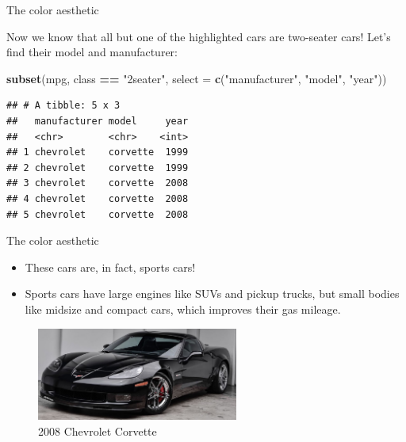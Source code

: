 \documentclass[ignorenonframetext,]{beamer}
\newenvironment{Shaded}{\begin{snugshade}}{\end{snugshade}}
\newcommand{\DataTypeTok}[1]{\textcolor[rgb]{0.13,0.29,0.53}{#1}}
\newcommand{\KeywordTok}[1]{\textcolor[rgb]{0.13,0.29,0.53}{\textbf{#1}}}
\newcommand{\NormalTok}[1]{#1}
\newcommand{\OperatorTok}[1]{\textcolor[rgb]{0.81,0.36,0.00}{\textbf{#1}}}
\newcommand{\StringTok}[1]{\textcolor[rgb]{0.31,0.60,0.02}{#1}}
\begin{document}
\begin{frame}[fragile]{The color aesthetic}
\protect\hypertarget{the-color-aesthetic-2}{}

Now we know that all but one of the highlighted cars are two-seater
cars! Let's find their model and manufacturer:

\begin{Shaded}
\begin{Highlighting}[]
\KeywordTok{subset}\NormalTok{(mpg, class }\OperatorTok{==}\StringTok{ "2seater"}\NormalTok{, }
       \DataTypeTok{select =} \KeywordTok{c}\NormalTok{(}\StringTok{"manufacturer"}\NormalTok{, }\StringTok{"model"}\NormalTok{, }\StringTok{"year"}\NormalTok{))}
\end{Highlighting}
\end{Shaded}

\begin{verbatim}
## # A tibble: 5 x 3
##   manufacturer model     year
##   <chr>        <chr>    <int>
## 1 chevrolet    corvette  1999
## 2 chevrolet    corvette  1999
## 3 chevrolet    corvette  2008
## 4 chevrolet    corvette  2008
## 5 chevrolet    corvette  2008
\end{verbatim}

\end{frame}

\begin{frame}{The color aesthetic}
\protect\hypertarget{the-color-aesthetic-3}{}

\begin{itemize}
\item
  These cars are, in fact, sports cars!
\item
  Sports cars have large engines like SUVs and pickup trucks, but small
  bodies like midsize and compact cars, which improves their gas
  mileage.
\end{itemize}

\begin{figure}
\centering
\includegraphics[width=2.60417in,height=\textheight]{figures/cc.jpg}
\caption{2008 Chevrolet Corvette}
\end{figure}

\end{frame}
\end{document}
